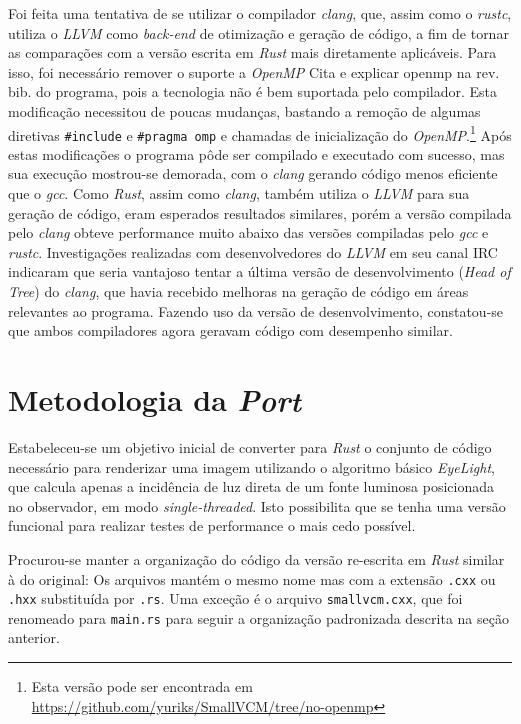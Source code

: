 \documentclass[tg]{mdtufsm}
\newcommand{\todo}[1]{\textsf{\color{red}#1}}
\begin{document}
Foi feita uma tentativa de se utilizar o compilador \emph{clang}, que, assim como o \emph{rustc}, utiliza o \emph{LLVM} como \emph{back-end} de otimização e geração de código, a fim de tornar as comparações com a versão escrita em \emph{Rust} mais diretamente aplicáveis. Para isso, foi necessário remover o suporte a \emph{OpenMP} \todo{Cita e explicar openmp na rev. bib.} do programa, pois a tecnologia não é bem suportada pelo compilador. Esta modificação necessitou de poucas mudanças, bastando a remoção de algumas diretivas \texttt{\#include} e \texttt{\#pragma omp} e chamadas de inicialização do \emph{OpenMP}.\footnote{Esta versão pode ser encontrada em \url{https://github.com/yuriks/SmallVCM/tree/no-openmp}} Após estas modificações o programa pôde ser compilado e executado com sucesso, mas sua execução mostrou-se demorada, com o \emph{clang} gerando código menos eficiente que o \emph{gcc}. Como \emph{Rust}, assim como \emph{clang}, também utiliza o \emph{LLVM} para sua geração de código, eram esperados resultados similares, porém a versão compilada pelo \emph{clang} obteve performance muito abaixo das versões compiladas pelo \emph{gcc} e \emph{rustc}. Investigações realizadas com desenvolvedores do \emph{LLVM} em seu canal IRC indicaram que seria vantajoso tentar a última versão de desenvolvimento (\emph{Head of Tree}) do \emph{clang}, que havia recebido melhoras na geração de código em áreas relevantes ao programa. Fazendo uso da versão de desenvolvimento, constatou-se que ambos compiladores agora geravam código com desempenho similar.

\section{Metodologia da \emph{Port}}

Estabeleceu-se um objetivo inicial de converter para \emph{Rust} o conjunto de código necessário para renderizar uma imagem utilizando o algoritmo básico \emph{EyeLight}, que calcula apenas a incidência de luz direta de um fonte luminosa posicionada no observador, em modo \emph{single-threaded}. Isto possibilita que se tenha uma versão funcional para realizar testes de performance o mais cedo possível.

Procurou-se manter a organização do código da versão re-escrita em \emph{Rust} similar à do original: Os arquivos mantém o mesmo nome mas com a extensão \texttt{.cxx} ou \texttt{.hxx} substituída por \texttt{.rs}. Uma exceção é o arquivo \texttt{smallvcm.cxx}, que foi renomeado para \texttt{main.rs} para seguir a organização padronizada descrita na seção anterior.
\end{document}
